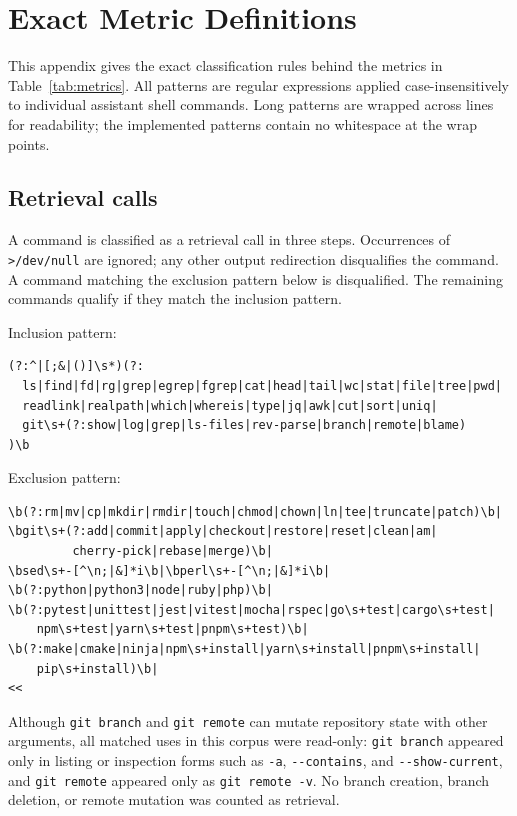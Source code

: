 \documentclass{article}
\begin{document}
\section{Exact Metric Definitions}
\label{app:metrics}

This appendix gives the exact classification rules behind the metrics in Table~\ref{tab:metrics}. All patterns are regular expressions applied case-insensitively to individual assistant shell commands. Long patterns are wrapped across lines for readability; the implemented patterns contain no whitespace at the wrap points.

\subsection{Retrieval calls}
\label{app:retrieval}

A command is classified as a retrieval call in three steps. Occurrences of \verb!>/dev/null! are ignored; any other output redirection disqualifies the command. A command matching the exclusion pattern below is disqualified. The remaining commands qualify if they match the inclusion pattern.

Inclusion pattern:

\begin{verbatim}
(?:^|[;&|()]\s*)(?:
  ls|find|fd|rg|grep|egrep|fgrep|cat|head|tail|wc|stat|file|tree|pwd|
  readlink|realpath|which|whereis|type|jq|awk|cut|sort|uniq|
  git\s+(?:show|log|grep|ls-files|rev-parse|branch|remote|blame)
)\b
\end{verbatim}

Exclusion pattern:

\begin{verbatim}
\b(?:rm|mv|cp|mkdir|rmdir|touch|chmod|chown|ln|tee|truncate|patch)\b|
\bgit\s+(?:add|commit|apply|checkout|restore|reset|clean|am|
         cherry-pick|rebase|merge)\b|
\bsed\s+-[^\n;|&]*i\b|\bperl\s+-[^\n;|&]*i\b|
\b(?:python|python3|node|ruby|php)\b|
\b(?:pytest|unittest|jest|vitest|mocha|rspec|go\s+test|cargo\s+test|
    npm\s+test|yarn\s+test|pnpm\s+test)\b|
\b(?:make|cmake|ninja|npm\s+install|yarn\s+install|pnpm\s+install|
    pip\s+install)\b|
<<
\end{verbatim}

Although \texttt{git branch} and \texttt{git remote} can mutate repository state with other arguments, all matched uses in this corpus were read-only: \texttt{git branch} appeared only in listing or inspection forms such as \verb!-a!, \verb!--contains!, and \verb!--show-current!, and \texttt{git remote} appeared only as \verb!git remote -v!. No branch creation, branch deletion, or remote mutation was counted as retrieval.
\end{document}
